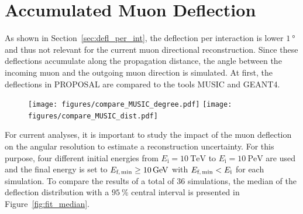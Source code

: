 \section{Accumulated Muon Deflection}\label{sec:accum_defl}

As shown in Section~\ref{sec:defl_per_int}, the deflection per interaction 
is lower $\SI{1}{\degree}$ and thus not relevant for the current muon 
directional reconstruction. Since these deflections accumulate along the 
propagation distance, the angle between the incoming muon and the outgoing 
muon direction is simulated. 
At first, the deflections in PROPOSAL are compared to 
the tools MUSIC and GEANT4.



\begin{figure}
    \centering
    \subcaptionbox{
        \label{fig:compare_MUSIC_degree}}
        {\texttt{[image: figures/compare\_MUSIC\_degree.pdf]}}
    \subcaptionbox{
        \label{fig:compare_MUSIC_dist}}
        {\texttt{[image: figures/compare\_MUSIC\_dist.pdf]}}
    \caption{}
    \label{fig:compare_MUSIC}
\end{figure}








For current analyses, it is important to study the impact of the muon 
deflection on the angular resolution to estimate a reconstruction uncertainty.
For this purpose, four different initial energies 
from $E_{\text{i}} = \SI{10}{\tera\electronvolt}$ to 
$E_{\text{i}} = \SI{10}{\peta\electronvolt}$ are used and the final 
energy is set to $E_{\text{f,\,min}} \geq \SI{10}{\giga\electronvolt}$ with 
$E_{\text{f,\,min}} < E_{\text{i}}$ for each simulation. To compare the results of 
a total of $\num{36}$ simulations, the median of the deflection distribution 
with a $\SI{95}{\percent}$ central interval is presented in 
Figure~\ref{fig:fit_median}.

\begin{equation}
    \label{eqn:fit_median}
\end{equation}



